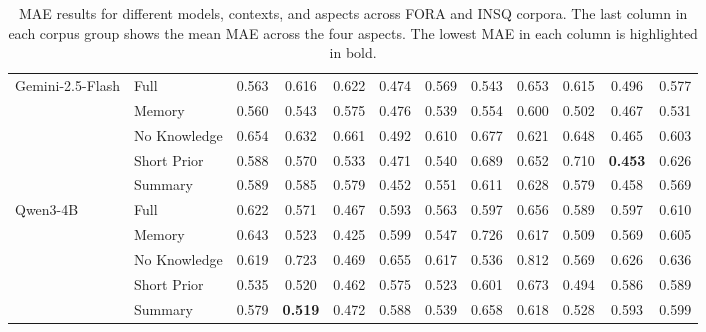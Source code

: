 \begin{table}[h]
{\begin{tabular}{llccccc|ccccc}
\midrule
Gemini-2.5-Flash & Full & 0.563 & 0.616 & 0.622 & 0.474 & 0.569 & 0.543 & 0.653 & 0.615 & 0.496 & 0.577 \\
 & Memory & 0.560 & 0.543 & 0.575 & 0.476 & 0.539 & 0.554 & 0.600 & 0.502 & 0.467 & 0.531 \\
 & No Knowledge & 0.654 & 0.632 & 0.661 & 0.492 & 0.610 & 0.677 & 0.621 & 0.648 & 0.465 & 0.603 \\
 & Short Prior & 0.588 & 0.570 & 0.533 & 0.471 & 0.540 & 0.689 & 0.652 & 0.710 & \textbf{0.453} & 0.626 \\
 & Summary & 0.589 & 0.585 & 0.579 & 0.452 & 0.551 & 0.611 & 0.628 & 0.579 & 0.458 & 0.569 \\
\midrule
Qwen3-4B & Full & 0.622 & 0.571 & 0.467 & 0.593 & 0.563 & 0.597 & 0.656 & 0.589 & 0.597 & 0.610 \\
 & Memory & 0.643 & 0.523 & 0.425 & 0.599 & 0.547 & 0.726 & 0.617 & 0.509 & 0.569 & 0.605 \\
 & No Knowledge & 0.619 & 0.723 & 0.469 & 0.655 & 0.617 & 0.536 & 0.812 & 0.569 & 0.626 & 0.636 \\
 & Short Prior & 0.535 & 0.520 & 0.462 & 0.575 & 0.523 & 0.601 & 0.673 & 0.494 & 0.586 & 0.589 \\
 & Summary & 0.579 & \textbf{0.519} & 0.472 & 0.588 & 0.539 & 0.658 & 0.618 & 0.528 & 0.593 & 0.599 \\
\bottomrule
\end{tabular}
}
\caption{MAE results for different models, contexts, and aspects across FORA and INSQ corpora. The last column in each corpus group shows the mean MAE across the four aspects. The lowest MAE in each column is highlighted in bold.}
\label{tab:mae_results}
\end{table}
